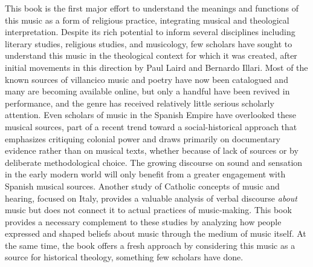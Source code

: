 This book is the first major effort to understand the meanings and functions of
this music as a form of religious practice, integrating musical and theological
interpretation.
Despite its rich potential to inform several disciplines including literary
studies, religious studies, and musicology, few scholars have sought to
understand this music in the theological context for which it was created,
after initial movements in this direction by Paul Laird and Bernardo Illari.%
    \Autocites
    {Laird:VC}
    {Illari:Polychoral}
Most of the known sources of villancico music and poetry have now been
catalogued and many are becoming available online, but only a handful have been
revived in performance, and the genre has received relatively little serious
scholarly attention.%
    \Autocites
    [Catalogs of villancico poetry imprints:][]{BNE:VCs17C}
    {BNE:VCs18C}
    {UK:VCs}
    {US:VCs}
    {Codina:MontserratVCs}
    [selected catalogs of collections including villancico 
    music manuscripts:][]{Pedrell:BNC}
    {Stanford:Catalog}
    {LopezCalo:Segovia}
    {Bonastre:CanetCatalog}
    {Ezquerro:CatalogoZaragoza}
    {Stevenson:Sources}
Even scholars of music in the Spanish Empire have overlooked these musical
sources, part of a recent trend toward a social-historical approach that
emphasizes critiquing colonial power and draws primarily on documentary
evidence rather than on musical texts, whether because of lack of sources or
by deliberate methodological choice.%
    \Autocites
    {Tomlinson:SingingNewWorld}
    {Baker:Harmony}
    {Irving:Colonial}
    {RamosKittrell:PlayingCathedral}
The growing discourse on sound and sensation in the early modern world will
only benefit from a greater engagement with Spanish musical sources.%
    \Autocites
    {Rath:EarlyAmerica}
    {Ochoa:Aurality}
    {Dean:ListeningPolyphony}
    {Gouk:MusicScienceMagic}
    {Gouk:Harmonics}
    {Gouk:Sciences}
    {Gouk:RepresentingEmotions}
    {Tomlinson:Magic}
    {Austern:Nature}
    {Daston:Wonders}
    {Feldman:Passions}
    {Wagstaff:Processions}
Another study of Catholic concepts of music and hearing, focused on Italy,
provides a valuable analysis of verbal discourse \emph{about} music but does
not connect it to actual practices of music-making.%
    \Autocite{DellAntonio:Listening}
This book provides a necessary complement to these studies by analyzing how
people expressed and shaped beliefs about music through the medium of music
itself.
At the same time, the book offers a fresh approach by considering this music as
a source for historical theology, something few scholars have done.

